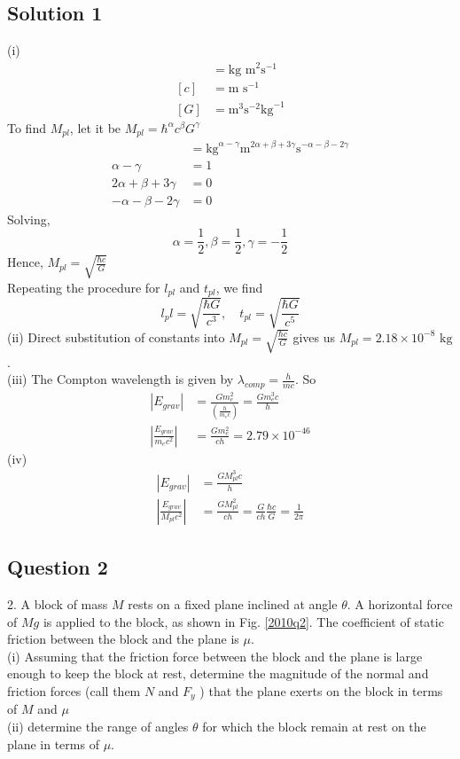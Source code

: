 \documentclass{article}
\begin{document}
\subsection{Solution 1}
(i)
\begin{align}
	[\hbar] &= \text{kg m}^2 \text{s}^{-1} \\
	[c] &= \text{m s}^{-1}\\
	[G] &= \text{m}^3 \text{s}^{-2} \text{kg}^{-1}
\end{align}
To find $M_{pl}$, let it be $M_{pl}=\hbar^\alpha c^\beta G^\gamma$
\begin{align}
	[M_{pl}] &= \text{kg}^{\alpha-\gamma} \text{m}^{2\alpha+\beta+3\gamma} \text{s}^{-\alpha-\beta-2\gamma} \\
	\alpha-\gamma &= 1\\
	2\alpha+\beta+3\gamma &= 0\\
	-\alpha-\beta-2\gamma &=0
\end{align}
Solving, 
\[\alpha=\frac{1}{2}, \beta=\frac{1}{2}, \gamma=-\frac{1}{2}\]
Hence, $M_{pl} = \sqrt{\frac{\hbar c}{G}}$\\
Repeating the procedure for $l_{pl}$ and $t_{pl}$, we find
\[l_pl = \sqrt{\frac{\hbar G}{c^3}}, \quad t_{pl} = \sqrt{\frac{\hbar G}{c^5}}\]
(ii) Direct substitution of constants into $M_{pl} = \sqrt{\frac{\hbar c}{G}}$ gives us $M_{pl} = 2.18 \times 10^{-8} \text{ kg}$.\\
(iii) The Compton wavelength is given by $\lambda_{comp} = \frac{h}{mc}$. So
\begin{align} 
	|E_{grav}| &= \frac{G m_e^2}{\left(\frac{h}{m_e c}\right) } = \frac{Gm_e^3 c}{h} \\
	\left|  \frac{E_{grav}}{m_e c^2} \right| &= \frac{Gm_e^2}{ch} = 2.79 \times 10^{-46}
\end{align}
(iv)
\begin{align} 
	|E_{grav}| &= \frac{GM_{pl}^3 c}{h}\\
	\left|  \frac{E_{grav}}{M_{pl} c^2} \right| &= \frac{GM_{pl}^2}{ch} = \frac{G}{ch} \frac{\hbar c}{G} = \frac{1}{2\pi} 
\end{align}
\subsection{Question 2}
2. A block of mass $M$ rests on a fixed plane inclined at angle $\theta$. A horizontal force of $Mg$ is applied to the block, as shown in Fig. \ref{2010q2}. The coefficient of static friction between the block and the plane is $\mu$. \\
(i) Assuming that the friction force between the block and the plane is large enough to keep the block at rest, determine the magnitude of the normal and friction forces (call them $N$ and $F_y$ ) that the plane exerts on the block in terms of $M$ and $\mu$\\
(ii) determine the range of angles $\theta$ for which the block remain at rest on the plane in terms of $\mu$. 
\end{document}
